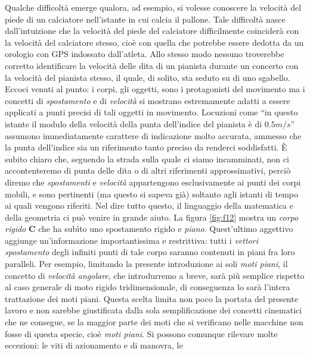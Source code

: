 \noindent Qualche difficolt\`a emerge qualora, ad esempio, si volesse conoscere la
velocit\`a del piede di un calciatore nell'istante in cui calcia il pallone.
Tale difficolt\`a nasce dall'intuizione che la velocit\`a del piede del
calciatore
difficilmente coincider\`a con la velocit\`a del calciatore stesso, cio\`e
con quella che potrebbe
essere dedotta da un orologio con GPS indossato dall'atleta.
Allo stesso modo nessuno troverebbe corretto
identificare la velocit\`a delle dita di un pianista durante un concerto
con la velocit\`a del pianista stesso, il quale, di solito, sta seduto su di
uno sgabello.
Eccoci venuti al punto: i corpi, gli oggetti, sono i protagonisti
del movimento ma i concetti 
di {\em spostamento} e di {\em velocit\`a}
si mostrano estremamente adatti a essere applicati a punti precisi di tali oggetti
in movimento. Locuzioni come ``in questo istante
il modulo della velocit\`a della punta dell'indice del
pianista \`e di $0.5 m/s$'' assumono immediatamente carattere 
di indicazione molto accurata, ammesso che la punta dell'indice
sia un riferimento tanto preciso da renderci soddisfatti.
\noindent \`E subito chiaro che,
seguendo la strada sulla quale ci siamo incamminati, non ci accontenteremo
di punta delle dita o di altri riferimenti approssimativi, perci\`o
diremo che
{\em spostamenti} e {\em velocit\`a} appartengono esclusivamente ai punti dei
corpi mobili, e sono pertinenti (ma questo si sapeva gi\`a) soltanto agli
istanti di tempo ai quali vengono riferiti. 
Nel dire tutto questo, il linguaggio della matematica e della geometria
ci pu\`o venire in grande aiuto.
La figura \ref{fig:f12} mostra un {\em corpo rigido} {\bf C} che ha sub\`ito
uno spostamento rigido e {\em piano}.
Quest'ultimo aggettivo aggiunge un'informazione
importantissima e restrittiva: tutti i {\em vettori spostamento} degli infiniti
punti di tale corpo saranno contenuti in piani fra loro paralleli.
Per esempio, limitando la presente introduzione
ai soli {\em moti piani}, il concetto di {\em velocit\`a angolare}, che introdurremo
a breve, sar\`a  pi\`u semplice rispetto al caso generale 
di moto rigido tridimensionale, di conseguenza lo sar\`a l'intera trattazione dei
moti piani.
Questa scelta limita non poco la portata del presente lavoro e non sarebbe 
giustificata dalla sola semplificazione dei concetti cinematici
che ne consegue,
se 
la maggior parte dei moti che si verificano nelle macchine non fosse
di questa specie, cio\`e {\em moti piani}.
Si possono comunque rilevare molte eccezioni: le viti di azionamento e di manovra, le
